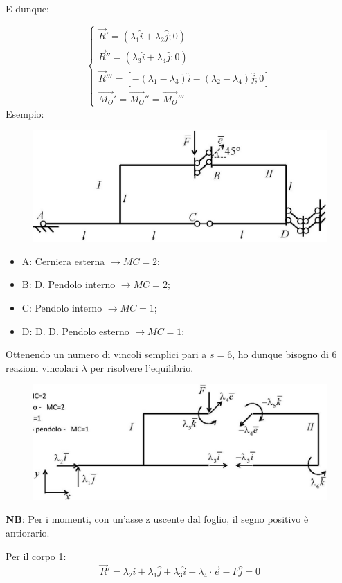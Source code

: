 \documentclass{article}
\begin{document}
\begin{adjustwidth}{2in}{}
 E dunque: 
 
\[
\begin{cases}
\vec{R}' = (\lambda_1 \hat{i} + \lambda_2 \hat{j}; 0) \\
\vec{R}'' = (\lambda_3 \hat{i} + \lambda_4 \hat{j}; 0) \\
\vec{R}''' = [-(\lambda_1 - \lambda_3) \hat{i} - (\lambda_2 - \lambda_4) \hat{j}; 0] \\
\vec{M_O}' = \vec{M_O}'' = \vec{M_O}'''
\end{cases}
\]
\newpage
Esempio: \newline
	\begin{figure}[H]
	\centering
	\includegraphics[width=0.4\linewidth]{immagini/1.PARTE2_Pagina_17 (2)}
\end{figure}
\begin{itemize}
\item A: Cerniera esterna $\rightarrow MC=2$;
\item B: D. Pendolo interno $\rightarrow MC=2$;
\item C: Pendolo interno $\rightarrow MC=1$;
\item D: D. D. Pendolo esterno $\rightarrow MC=1$;
\end{itemize}

Ottenendo un numero di vincoli semplici pari a $ s = 6$, ho dunque bisogno di 6 reazioni vincolari $\lambda$ per risolvere l'equilibrio.
\begin{figure}[H]
	\centering
	\includegraphics[width=0.4\linewidth]{immagini/1.PARTE2_Pagina_17}
\end{figure}

\textbf{NB}: Per i momenti, con un'asse z uscente dal foglio, il segno positivo è antiorario. \newline

Per il corpo 1: 
\[
\vec{R}' = \lambda_2 \hat{i} + \lambda_1 \hat{j} + \lambda_3 \hat{i} + \lambda_4 \cdot \vec{e} - F \hat{j} = 0
\]


\end{adjustwidth}
\end{document}
